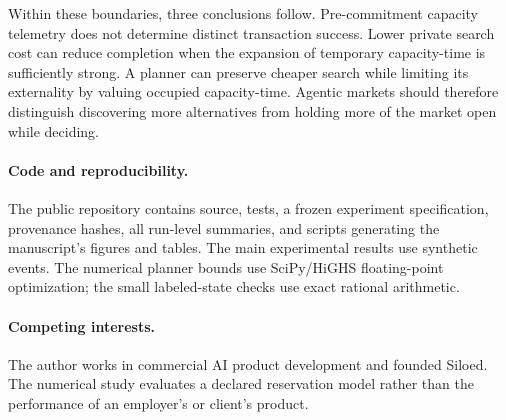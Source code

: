 \documentclass[11pt,a4paper]{article}
\begin{document}
Within these boundaries, three conclusions follow. Pre-commitment capacity telemetry does not determine distinct transaction success. Lower private search cost can reduce completion when the expansion of temporary capacity-time is sufficiently strong. A planner can preserve cheaper search while limiting its externality by valuing occupied capacity-time. Agentic markets should therefore distinguish discovering more alternatives from holding more of the market open while deciding.

\paragraph{Code and reproducibility.}
The public repository contains source, tests, a frozen experiment specification, provenance hashes, all run-level summaries, and scripts generating the manuscript's figures and tables. The main experimental results use synthetic events. The numerical planner bounds use SciPy/HiGHS floating-point optimization; the small labeled-state checks use exact rational arithmetic.

\paragraph{Competing interests.}
The author works in commercial AI product development and founded Siloed. The numerical study evaluates a declared reservation model rather than the performance of an employer's or client's product.
\end{document}
